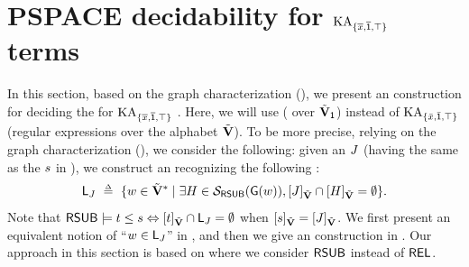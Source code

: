 \newcommand{\Con}{\mathrm{Con}}
\newcommand{\Saturable}{\mathrm{Saturable}}
\section{PSPACE decidability for $\mathrm{KA}_{\{\overline{x}, \overline{\mathsf{1}}, \top\}}$ terms}\label{section: decidability}
In this section, based on the graph characterization (),
we present an  construction for deciding the  for $\mathrm{KA}_{\{\overline{x}, \overline{\mathsf{1}}, \top\}}$ .
Here, we will use  ( over $\tilde{\mathbf{V}}_{\mathsf{1}}$) instead of $\mathrm{KA}_{\{\bar{x}, \bar{\mathsf{1}}, \top\}}$  (regular expressions over the alphabet $\tilde{\mathbf{V}}$).
To be more precise, relying on the graph characterization (),
we consider the following: given an  $\graph[3]$ (having the same  as the  $\term[2]$ in ), we construct an  recognizing the following :
\[\const{L}_{\graph[3]} \ \defeq\  \set{\word \in \tilde{\vsig}^* \mid \exists \graph[2] \in \FillS_{\RSUB}(\const{\graph}(\word)), \ljump{\graph[3]}_{\tilde{\vsig}} \cap \ljump{\graph[2]}_{\tilde{\vsig}} = \emptyset}.\]
Note that $\RSUB \models \term[1] \le \term[2] \Leftrightarrow \ljump{\term}_{\tilde{\vsig}} \cap \const{L}_{\graph[3]} = \emptyset$ when $\ljump{\term[2]}_{\tilde{\vsig}} =\ljump{\graph[3]}_{\tilde{\vsig}}$.
We first present an equivalent notion of ``$\word \in \const{L}_{\graph[3]}$'' in , and then we give an  construction in .
Our approach in this section is based on \cite{nakamuraExistentialCalculiRelations2023} where we consider $\mathsf{RSUB}$ instead of $\mathsf{REL}$.
